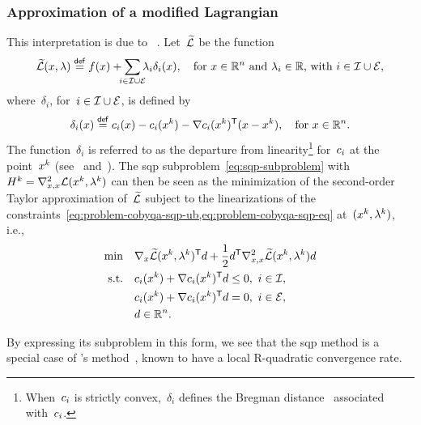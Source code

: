 \subsubsection{Approximation of a modified Lagrangian}

This interpretation is due to \citeauthor{Robinson_1972a}~\cite[Rem.~4]{Robinson_1972a}.
Let~$\widetilde{\lag}$ be the function
\begin{equation*}
    \widetilde{\lag}(\iter, \lm) \eqdef \obj(\iter) + \sum_{\mathclap{i \in \iub \cup \ieq}} \lm_i \delta_i(\iter), \quad \text{for~$\iter \in \R^n$ and~$\lm_i \in \R$, with~$i \in \iub \cup \ieq$},
\end{equation*}
where~$\delta_i$, for~$i \in \mathcal{I} \cup \mathcal{E}$, is defined by
\begin{equation*}
    \delta_i(\iter) \eqdef \con{i}(\iter) - \con{i}(\iter[k]) - \nabla \con{i}(\iter[k])^{\T} (\iter - \iter[k]), \quad \text{for~$\iter \in \R^n$.}
\end{equation*}
The function~$\delta_i$ is referred to as the departure from linearity\footnote{When~$c_{i}$ is strictly convex,~$\delta_i$ defines the Bregman distance~\cite{Bregman_1967} associated with~$c_{i}$.} for~$c_{i}$ at the point~$\iter[k]$ (see~\cite[\S~2]{Gill_Wong_2011} and~\cite[\S~2.3]{Gill_Murray_Saunders_2005}).
The \gls{sqp} subproblem~\cref{eq:sqp-subproblem} with~$H^k = \nabla_{x, x}^2 \lag(\iter[k], \lm[k])$ can then be seen as the minimization of the second-order Taylor approximation of~$\widetilde{\lag}$ subject to the linearizations of the constraints~\cref{eq:problem-cobyqa-sqp-ub,eq:problem-cobyqa-sqp-eq} at~$(\iter[k], \lm[k])$, i.e.,
\begin{align*}
    \min        & \quad \nabla_x \widetilde{\lag}(\iter[k], \lm[k])^{\T} \step + \frac{1}{2} \step^{\T} \nabla_{x, x}^2 \widetilde{\lag}(\iter[k], \lm[k]) \step\\
    \text{s.t.} & \quad \con{i}(\iter[k]) + \nabla \con{i}(\iter[k])^{\T} \step \le 0, ~ i \in \iub,\\
                & \quad \con{i}(\iter[k]) + \nabla \con{i}(\iter[k])^{\T} \step = 0, ~ i \in \ieq,\\
                & \quad \step \in \R^n.
\end{align*}

By expressing its subproblem in this form, we see that the \gls{sqp} method is a special case of \citeauthor{Robinson_1972a}'s method~\cite{Robinson_1972a}, known to have a local R-quadratic convergence rate.

